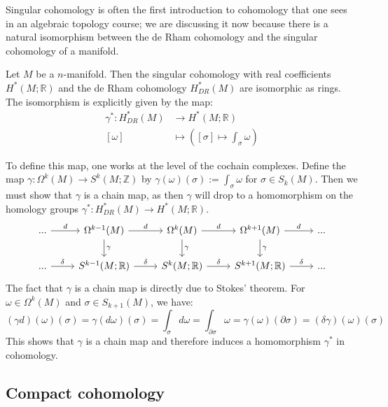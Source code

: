 Singular cohomology is often the first introduction to cohomology that one sees in an algebraic topology course; we are 
discussing it now because there is a natural isomorphism between the de Rham cohomology and the singular cohomology 
of a manifold. 
\begin{theorem}[de Rham]
	Let $M$ be a $n$-manifold. Then the singular cohomology with real coefficients $H^*(M; \mathbb R)$ and the 
	de Rham cohomology $H_{DR}^*(M)$ are isomorphic as rings. The isomorphism is explicitly given by the map:
	\begin{align}
		\gamma^* : H_{DR}^*(M)&\rightarrow H^*(M; \mathbb R) \\
		[\omega] &\mapsto \left([\sigma]\mapsto \int_\sigma\omega\right)
	\end{align}
\end{theorem}
To define this map, one works at the level of the cochain complexes. Define the map $\gamma : \Omega^k(M)\rightarrow 
S^k(M; \mathbb Z)$ by $\gamma(\omega)(\sigma) := \int_\sigma\omega$ for $\sigma\in S_k(M)$. Then we must show 
that $\gamma$ is a chain map, as then $\gamma$ will drop to a homomorphism on the homology groups $\gamma^* : 
H_{DR}^*(M)\rightarrow H^*(M; \mathbb R)$. 
\begin{equation}\begin{tikzcd}
	...\arrow[r, "d"] & \Omega^{k - 1}(M)\arrow[d, "\gamma"]\arrow[r, "d"] & \Omega^{k}(M)\arrow[d, "\gamma"]\arrow[r, "d"] 
	& \Omega^{k + 1}(M)\arrow[d, "\gamma"]\arrow[r, "d"] & ... \\
	... \arrow[r, "\delta"] & S^{k - 1}(M; \mathbb R) \arrow[r, "\delta"] & S^{k}(M; \mathbb R) \arrow[r, "\delta"] & 
	S^{k + 1}(M; \mathbb R) \arrow[r, "\delta"] & ...
\end{tikzcd}\end{equation}
The fact that $\gamma$ is a chain map is directly due to Stokes' theorem. For $\omega\in\Omega^k(M)$ and 
$\sigma\in S_{k + 1}(M)$, we have:
\begin{equation}
	(\gamma d)(\omega)(\sigma) = \gamma(d\omega)(\sigma) = \int_\sigma d\omega = \int_{\partial\sigma}\omega = 
	\gamma(\omega)(\partial\sigma) = (\delta\gamma)(\omega)(\sigma)
\end{equation}
This shows that $\gamma$ is a chain map and therefore induces a homomorphism $\gamma^*$ in cohomology. 

\subsection{Compact cohomology}

